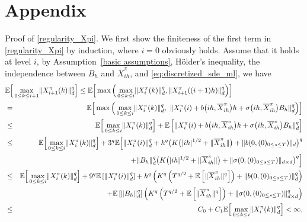 \documentclass[12pt]{article}
\numberwithin{equation}{section}
\newcommand{\abs}[1]{\lvert#1\rvert}
\newcommand{\norm}[1]{\lVert#1\rVert}
\newcommand{\E}{\mathbb{E}}
\begin{document}
\section{Appendix}
\label{appendix}
\noindent
Proof of \eqref{regularity_Xpi}.
 We first show the finiteness of
the first term in \eqref{regularity_Xpi} by induction,
where $i=0$ obviously holds.
Assume that it holds at level $i$, by Assumption~\ref{basic assumptions},
H\"older's inequality, the independence between $B_h$ and $\overline{X}^\pi_{ih}$,
and \eqref{eq:discretized_sde_ml}, we have
\begin{eqnarray*}
  \lefteqn{
    \E \Big[\max\limits_{0 \leq k \leq i+1} \norm{X^\pi_{i+1}(k)}_d^q\Big]
            \leq
                \E \Big[\max\Big( \max\limits_{0 \leq k \leq i} \norm{X^\pi_i(k)}_d^q,
                \norm{X^\pi_{i+1}((i+1)h)}_d^q \Big)\Big]
  }
  \\
            &= &
                \E \Big[\max\Big( \max\limits_{0 \leq k \leq i} \norm{X^\pi_i(k)}_d^q,
                \ \norm{X^\pi_i(i)
                        + b\big(ih, \overline{X}^\pi_{ih}\big)h
                        + \sigma\big(ih, \overline{X}^\pi_{ih}\big)B_h }_d^q \Big)\Big]
            \\
            &\leq &
            \E \Big[ \max\limits_{0 \leq k \leq i} \norm{X^\pi_i(k)}_d^q\Big] +
                \E \left[ \norm{X^\pi_i(i)
                        + b\big(ih, \overline{X}^\pi_{ih}\big) h
                        + \sigma\big(ih, \overline{X}^\pi_{ih}\big)B_h }_d^q\right]
            \\
            &\leq &
            \E \Big[ \max\limits_{0 \leq k \leq i} \norm{X^\pi_i(k)}_d^q\Big] +
                3^q \E \Bigl[ \norm{X^\pi_i(i)}_d^q
  + h^q \big(K \big(\abs{ih}^{1/2} + \norm{\overline{X}^\pi_{ih}}\big) +
                    \norm{b(0,(0)_{0\leq s\leq T})}_d \big)^q
            \\
            & &  \quad + \norm{B_h}_d^q \big(K \big(\abs{ih}^{1/2} + \norm{\overline{X}^\pi_{ih}}\big) +
                \norm{\sigma(0,(0)_{0\leq s\leq T})}_{d\times d} \big)^q\Bigr]
            \\
            &\leq &
            \E \Big[ \max\limits_{0 \leq k \leq i} \norm{X^\pi_i(k)}_d^q\Big] +
                9^q \E \left[ \norm{X^\pi_i(i)}_d^q \right]
  + h^q \left(K^q \left(T^{q/2} + \E \left[ \norm{\overline{X}^\pi_{ih}}^q\right]\right) +
                    \norm{b(0,(0)_{0\leq s\leq T})}_d^q \right)
            \\
            & &  \quad + \E \left[ \norm{B_h}_d^q \right] \left(K^q \left(T^{q/2} + \E \left[ \norm{\overline{X}^\pi_{ih}}^q\right]\right) +
                    \norm{\sigma(0,(0)_{0\leq s\leq T})}_{d\times d}^q \right)
            \\
            &\leq & C_0 + C_1 \E \Big[\max\limits_{0 \leq k \leq i}
                    \norm{X^\pi_i(k)}_d^q\Big] < \infty,
\end{eqnarray*}
\end{document}
